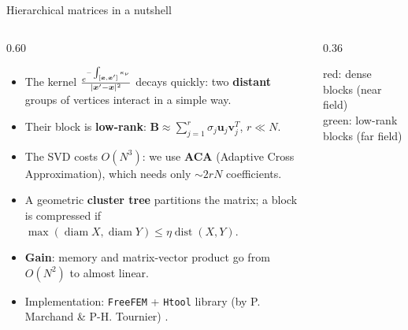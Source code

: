 \documentclass[8pt, xcolor=table,aspectratio=169]{beamer}
\begin{document}
\begin{frame}{\textcolor{activecolor}{Hierarchical matrices in a nutshell}}
  \begin{columns}[T]
    \begin{column}{0.60\textwidth}
      \begin{itemize}[label=$\square$]\setlength\itemsep{0.9em}
        \item The kernel $\frac{e^{-\int_{[\boldsymbol{x},\boldsymbol{x}']}\kappa_\nu}}{|\boldsymbol{x}'-\boldsymbol{x}|^2}$ decays quickly: two \textbf{distant} groups of vertices interact in a simple way.
        \item Their block is \textbf{low-rank}: $\mathbf{B}\approx\sum_{j=1}^{r}\sigma_j\mathbf{u}_j\mathbf{v}_j^{T}$, $r\ll N$.
        \item The SVD costs $O(N^3)$: we use \textbf{ACA} (Adaptive Cross Approximation), which needs only $\sim 2rN$ coefficients.
        \item A geometric \textbf{cluster tree} partitions the matrix; a block is compressed if $\max(\operatorname{diam}X,\operatorname{diam}Y)\le\eta\operatorname{dist}(X,Y)$.
        \item \textbf{Gain}: memory and matrix-vector product go from $O(N^2)$ to almost linear.
        \item Implementation: \texttt{FreeFEM} + \texttt{Htool} library \small(by P. Marchand \& P-H. Tournier)  .
      \end{itemize}
    \end{column}
    \begin{column}{0.36\textwidth}
      \centering

      \medskip
      {\small \textcolor{red!70!black}{red}: dense blocks (near field)\\
      \textcolor{green!40!black}{green}: low-rank blocks (far field)}
    \end{column}
  \end{columns}
\end{frame}
\end{document}

